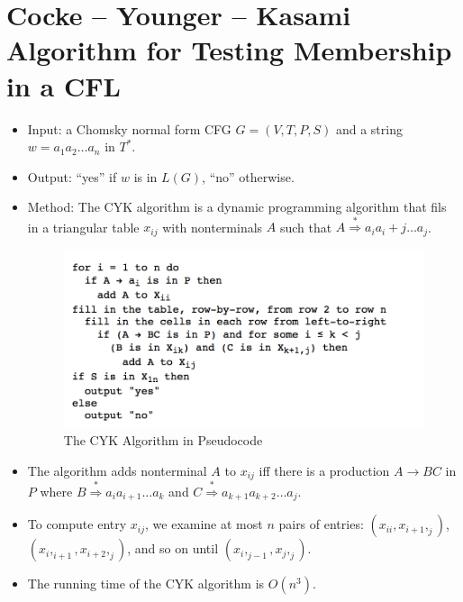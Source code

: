 \documentclass[]{article}
\begin{document}
\section{Cocke -- Younger -- Kasami Algorithm for Testing Membership in a CFL}
  \begin{itemize}
    \item Input: a Chomsky normal form CFG $G = (V,T,P,S)$ and a string $w = 
    a_1a_2\ldots{a_n}$ in $T^*$.
    \item Output: ``yes'' if $w$ is in $L(G)$, ``no'' otherwise.
    \item Method: The CYK algorithm is a dynamic programming algorithm that 
    fils in a triangular table $x_{ij}$ with nonterminals $A$ such that $A 
    \overset{*}{\Rightarrow} a_ia_i+j\ldots{a_j}$.
      \begin{figure}[p]
        \includegraphics{./img/CYK_Algorithm.png}
        \caption{The CYK Algorithm in Pseudocode}
      \end{figure}
    \item The algorithm adds nonterminal $A$ to $x_{ij}$ iff there is a 
    production $A \rightarrow BC$ in $P$ where $B \overset{*}{\Rightarrow}
    a_ia_{i+1}\ldots{a_k}$ and $C \overset{*}{\Rightarrow}a_{k+1}a_{k
    +2}\ldots{a_j}$.
    \item To compute entry $x_{ij}$, we examine at most $n$ pairs of entries: 
    $(x_{ii},x_{i+1},_j)$,$(x_i,_{i+1},x_{i+2},_j)$, and so on until $
    (x_i,_{j-1},x_{j},_j)$.
    \item The running time of the CYK algorithm is $O(n^3)$.
  \end{itemize}
\end{document}
